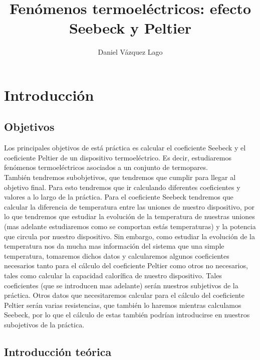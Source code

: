 \documentclass[12pt,a4paper]{article}
\author{Daniel Vázquez Lago}
\title{Fenómenos termoeléctricos: efecto Seebeck y Peltier}
\begin{document}
\maketitle

\newpage

\tableofcontents

\newpage

\section{Introducción}

\subsection{Objetivos}

Los principales objetivos de está práctica es calcular el coeficiente Seebeck y el coeficiente Peltier de un dispositivo termoeléctrico. Es decir, estudiaremos fenómenos termoeléctricos asociados a un conjunto de termopares.  \\

También tendremos subobjetivos, que tendremos que cumplir para llegar al objetivo final. Para esto tendremos que ir calculando diferentes coeficientes y valores a lo largo de la práctica. Para el coeficiente Seebeck tendremos que calcular la diferencia de temperatura entre las uniones de nuestro dispositivo, por lo que tendremos que estudiar la evolución de la temperatura de nuestras uniones (mas adelante estudiaremos como se comportan estás temperaturas) y la potencia que circula por nuestro dispositivo. Sin embargo, como estudiar la evolución de la temperatura nos da mucha mas información del sistema que una simple temperatura, tomaremos dichos datos y calcularemos algunos coeficientes necesarios tanto para el cálculo del coeficiente Peltier como otros no necesarios, tales como calcular la capacidad calorífica de nuestro dispositivo. Tales coeficientes (que se introducen mas adelante) serán nuestros subjetivos de la práctica. Otros datos que necesitaremos calcular para el cálculo del coeficiente Peltier serán varias resistencias, que también lo haremos mientras calculamos Seebeck, por lo que el cálculo de estas también podrían introducirse en nuestros subojetivos de la práctica.

\subsection{Introducción teórica}
\end{document}
